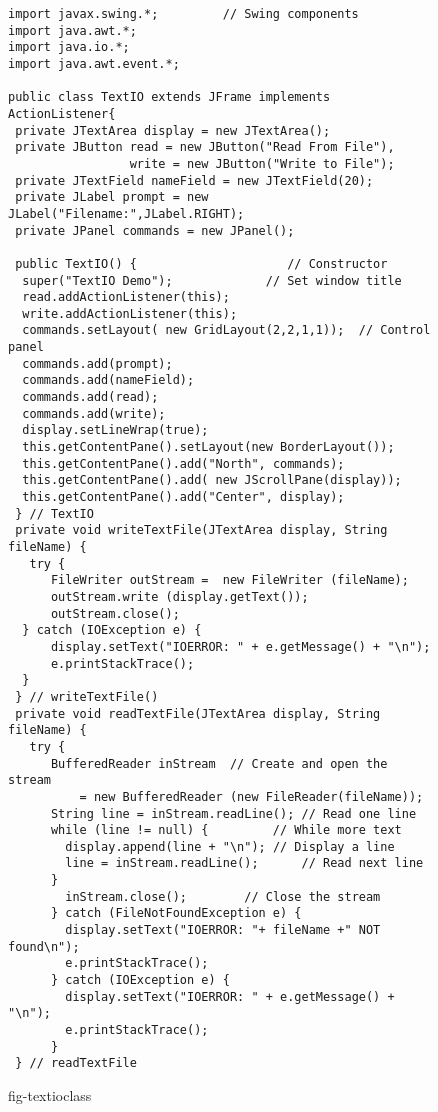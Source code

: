 \begin{figure}[p]
\jjjprogstart
\begin{jjjlisting}[30pc]
\begin{lstlisting}
import javax.swing.*;         // Swing components
import java.awt.*;
import java.io.*;
import java.awt.event.*;

public class TextIO extends JFrame implements ActionListener{
 private JTextArea display = new JTextArea();
 private JButton read = new JButton("Read From File"),
                 write = new JButton("Write to File");
 private JTextField nameField = new JTextField(20);
 private JLabel prompt = new JLabel("Filename:",JLabel.RIGHT);
 private JPanel commands = new JPanel();

 public TextIO() {                     // Constructor
  super("TextIO Demo");             // Set window title
  read.addActionListener(this);
  write.addActionListener(this);
  commands.setLayout( new GridLayout(2,2,1,1));  // Control panel
  commands.add(prompt);
  commands.add(nameField);
  commands.add(read);
  commands.add(write);
  display.setLineWrap(true);
  this.getContentPane().setLayout(new BorderLayout());
  this.getContentPane().add("North", commands);
  this.getContentPane().add( new JScrollPane(display));
  this.getContentPane().add("Center", display);
 } // TextIO
 private void writeTextFile(JTextArea display, String fileName) {
   try {
      FileWriter outStream =  new FileWriter (fileName);
      outStream.write (display.getText());
      outStream.close();
  } catch (IOException e) {
      display.setText("IOERROR: " + e.getMessage() + "\n");
      e.printStackTrace();
  }
 } // writeTextFile()
 private void readTextFile(JTextArea display, String fileName) {
   try {
      BufferedReader inStream  // Create and open the stream
          = new BufferedReader (new FileReader(fileName));
      String line = inStream.readLine(); // Read one line
      while (line != null) {         // While more text
        display.append(line + "\n"); // Display a line
        line = inStream.readLine();      // Read next line
      }
        inStream.close();        // Close the stream
      } catch (FileNotFoundException e) {
        display.setText("IOERROR: "+ fileName +" NOT found\n");
        e.printStackTrace();
      } catch (IOException e) {
        display.setText("IOERROR: " + e.getMessage() + "\n");
        e.printStackTrace();
      }
 } // readTextFile
\end{lstlisting}
\end{jjjlisting}
{fig-textioclass}
\end{figure}

